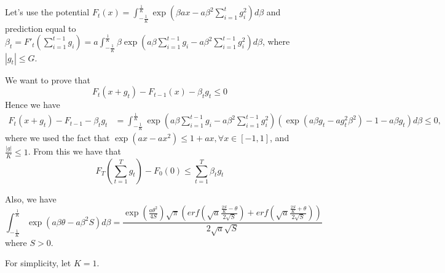 \documentclass{colt2016_empty} %
\begin{document}
Let's use the potential $F_t(x)=\int_{-\tfrac{1}{K}}^{\tfrac{1}{K}} \exp(\beta a x - a \beta^2 \sum_{i=1}^t g_i^2) d\beta$ and prediction equal to $\beta_{t}=F'_t(\sum_{i=1}^{t-1} g_i)=a \int_{-\tfrac{1}{K}}^{\tfrac{1}{K}} \beta \exp(a \beta \sum_{i=1}^{t-1} g_i - a \beta^2 \sum_{i=1}^{t-1} g_i^2) d\beta$, where $|g_t|\leq G$.

We want to prove that
\[
F_t(x+g_t) - F_{t-1}(x) -\beta_t g_t \leq 0
\]
Hence we have
\begin{align}
F_t(x+g_t) - F_{t-1} -\beta_t g_t 
&=\int_{-\tfrac{1}{K}}^{\tfrac{1}{K}} \exp(a \beta \sum_{i=1}^{t-1} g_i - a \beta^2 \sum_{i=1}^{t-1} g_i^2)(\exp(a \beta g_t-a g_t^2 \beta^2) -1 - a \beta g_t) d\beta \leq 0,
\end{align}
where we used the fact that $\exp(a x-a x^2)\leq 1+ a x, \forall x\in[-1,1]$, and $\frac{|g|}{K}\leq 1$.
From this we have that
\[
F_T(\sum_{t=1}^T g_t) - F_0 (0) \leq \sum_{t=1}^T \beta_t g_t
\]

Also, we have
\[
\int_{-\tfrac{1}{K}}^{\tfrac{1}{K}} \exp(a \beta \theta - a \beta^2 S) d\beta 
= \frac{\exp(\frac{a \theta^2}{4 S}) \sqrt{\pi} (erf(\sqrt{a}\frac{\frac{2 S}{K}-\theta}{2 \sqrt{S}})+erf(\sqrt{a}\frac{\frac{2 S}{K}+\theta}{2 \sqrt{S}}))}{2 \sqrt{a} \sqrt{S}}
\]
where $S>0$.

For simplicity, let $K=1$.
\end{document}
